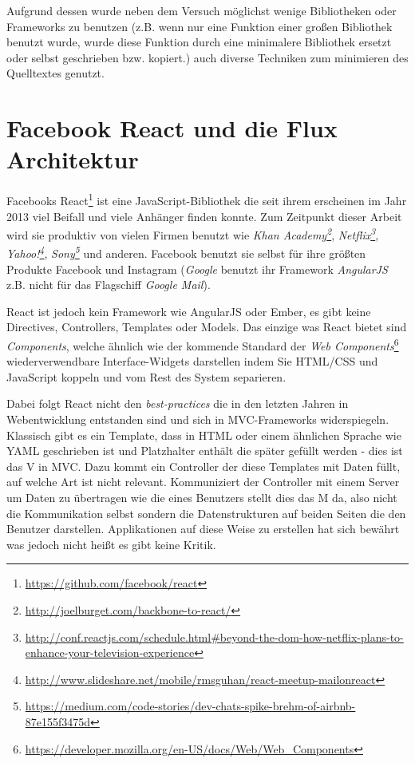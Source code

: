 \documentclass[12pt,twoside]{book}
\begin{document}
Aufgrund dessen wurde neben dem Versuch möglichst wenige Bibliotheken oder Frameworks zu benutzen (z.B. wenn nur eine Funktion einer großen Bibliothek benutzt wurde, wurde diese Funktion durch eine minimalere Bibliothek ersetzt oder selbst geschrieben bzw. kopiert.) auch diverse Techniken zum minimieren des Quelltextes genutzt.



\section*{Facebook React und die Flux Architektur}

Facebooks React\footnote{\url{https://github.com/facebook/react}} ist eine JavaScript-Bibliothek die seit ihrem erscheinen im Jahr 2013 viel Beifall und viele Anhänger finden konnte. Zum Zeitpunkt dieser Arbeit wird sie produktiv von vielen Firmen benutzt wie \textit{Khan Academy\footnote{\url{http://joelburget.com/backbone-to-react/}}}, \textit{Netflix\footnote{\url{http://conf.reactjs.com/schedule.html\#beyond-the-dom-how-netflix-plans-to-enhance-your-television-experience}}}, \textit{Yahoo!\footnote{\url{http://www.slideshare.net/mobile/rmsguhan/react-meetup-mailonreact}}}, \textit{Sony\footnote{\url{https://medium.com/code-stories/dev-chats-spike-brehm-of-airbnb-87e155f3475d}}} und anderen. Facebook benutzt sie selbst für ihre größten Produkte Facebook und Instagram (\textit{Google} benutzt ihr Framework \textit{AngularJS} z.B. nicht für das Flagschiff \textit{Google Mail}).

React ist jedoch kein Framework wie AngularJS oder Ember, es gibt keine Directives, Controllers, Templates oder Models. Das einzige was React bietet sind \textit{Components}, welche ähnlich wie der kommende Standard der \textit{Web Components}\footnote{\url{https://developer.mozilla.org/en-US/docs/Web/Web_Components}} wiederverwendbare Interface-Widgets darstellen indem Sie HTML/CSS und JavaScript koppeln und vom Rest des System separieren.

Dabei folgt React nicht den \textit{best-practices} die in den letzten Jahren in Webentwicklung entstanden sind und sich in MVC-Frameworks widerspiegeln. Klassisch gibt es ein Template, dass in HTML oder einem ähnlichen Sprache wie YAML geschrieben ist und Platzhalter enthält die später gefüllt werden - dies ist das V in MVC.
Dazu kommt ein Controller der diese Templates mit Daten füllt, auf welche Art ist nicht relevant. Kommuniziert der Controller mit einem Server um Daten zu übertragen wie die eines Benutzers stellt dies das M da, also nicht die Kommunikation selbst sondern die Datenstrukturen auf beiden Seiten die den Benutzer darstellen.
Applikationen auf diese Weise zu erstellen hat sich bewährt was jedoch nicht heißt es gibt keine Kritik.
\end{document}
